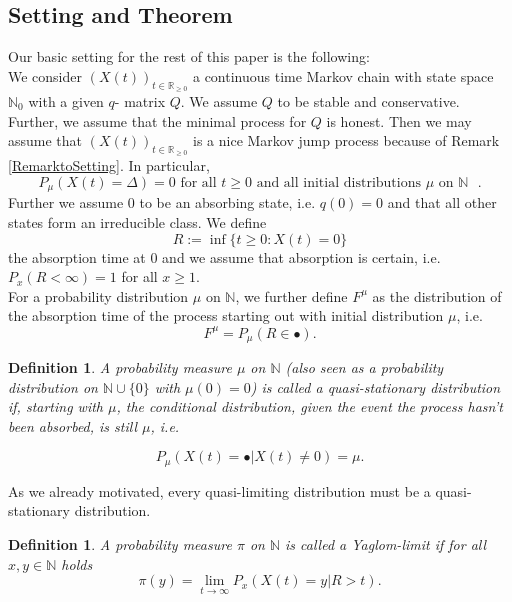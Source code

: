 \documentclass[12pt,a4paper]{scrartcl}
\newtheorem{definition}[theorem]{Definition}
\numberwithin{equation}{section}
\newcommand{\R}{\mathbb{R}} %
\newcommand{\N}{\mathbb{N}} %
\begin{document}
\subsection{Setting and Theorem}
Our basic setting for the rest of this paper is the following:\\
We consider $\left(X\left(t\right)\right)_{t \in \R_{\geq 0}}$ a continuous time Markov chain with state space $\N_0$ with a given $q$- matrix $Q$. We assume $Q$ to be stable and conservative. Further, we assume that the minimal process for $Q$ is honest. Then we may assume that $\left(X\left(t\right)\right)_{t \in \R_{\geq 0}} $ is a nice Markov jump process because of Remark \ref{RemarktoSetting}.
In particular,
$$ P_{\mu}\left(X\left(t\right) = \Delta \right) = 0 \text{ for all $t \geq 0$ and all initial distributions $\mu$ on $\N$ }. $$
Further we assume $0$ to be an absorbing state, i.e. $q\left(0\right) = 0$ and that all other states form an irreducible class.
We define
$$ R := \inf \lbrace t\geq 0 : X\left(t\right) = 0\rbrace  $$
the absorption time at $0$ and we assume that absorption is certain, i.e. $ P_x \left(R < \infty\right) = 1 $ for all $x \geq 1 $. \\
For a probability distribution $\mu$ on $\N$, we further define $F^{\mu}$ as the distribution of the absorption time of the process starting out with initial distribution $\mu$, i.e.
\begin{equation}
F^{\mu} = P_{\mu}\left(R \in \bullet\right).
\end{equation} 

\begin{definition}
A probability measure $\mu$ on $\N$ (also seen as a probability distribution on $\N \cup \lbrace  0\rbrace $ with $\mu\left(0\right) = 0$) is called a quasi-stationary distribution if, starting with $\mu$, the conditional distribution, given the event the process hasn't been absorbed, is still $\mu$, i.e.

$$ P_{\mu}\left(X\left(t\right) = \bullet | X\left(t\right) \neq 0\right) = \mu.$$

\end{definition}

As we already motivated, every quasi-limiting distribution must be a quasi-stationary distribution.
\begin{definition}
A probability measure $\pi$ on $\N$ is called a Yaglom-limit if for all $x,y \in \N$ holds
$$ \pi\left(y\right) = \lim_{t \to \infty} P_x\left(X\left(t\right) = y | R > t \right). $$
\end{definition}
\end{document}
